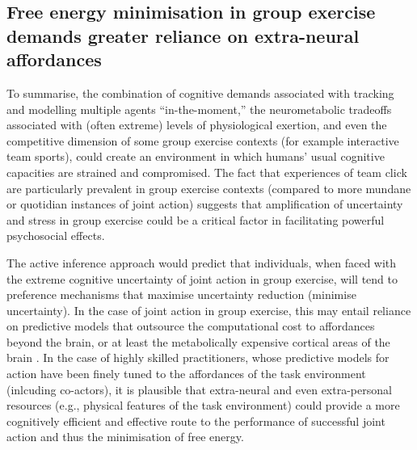 \begin{CJK}{UTF8}{gbsn}
    \subsection{Free energy minimisation in group exercise demands greater reliance on extra-neural affordances \label{sect:extraNeural}}
    To summarise, the combination of cognitive demands associated with tracking and modelling multiple agents ``in-the-moment,'' the neurometabolic tradeoffs associated with (often extreme) levels of physiological exertion, and even the competitive dimension of some group exercise contexts (for example interactive team sports), could create an environment in which humans' usual cognitive capacities are strained and compromised.  The fact that experiences of team click are particularly prevalent in group exercise contexts (compared to more mundane or quotidian instances of joint action) suggests that amplification of uncertainty and stress in group exercise could be a critical factor in facilitating powerful psychosocial effects.

    The active inference approach would predict that individuals, when faced with the extreme cognitive uncertainty of joint action in group exercise, will tend to preference mechanisms that maximise uncertainty reduction (minimise uncertainty).  In the case of joint action in group exercise, this may entail reliance on predictive models that outsource the computational cost to affordances beyond the brain, or at least the metabolically expensive cortical areas of the brain \citep{Dietrich2004,Clark2015}.  In the case of highly skilled practitioners, whose predictive models for action have been finely tuned to the affordances of the task environment (inlcuding co-actors), it is plausible that extra-neural and even extra-personal resources (e.g., physical features of the task environment) could provide a more cognitively efficient and effective route to the performance of successful joint action and thus the minimisation of free energy.


\end{CJK}
